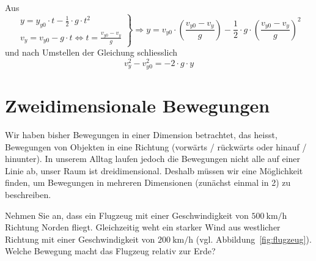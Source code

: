 \begin{solution}
Aus
\[ \left.\begin{array}{r}y=y_{y0} \cdot t - \frac{1}{2} \cdot g \cdot t^{2} \\ v_{y} = v_{y0} - g\cdot t \Leftrightarrow t = \frac{v_{y0} - v_{y}}{g} \end{array}  \right\} \Rightarrow y = v_{y0} \cdot \left( \frac{v_{y0} - v_{y}}{g} \right) - \frac{1}{2} \cdot g \cdot \left( \frac{v_{y0} - v_{y}}{g} \right)^{2} \]
und nach Umstellen der Gleichung schliesslich
\[ v_{y}^{2} - v_{y0}^{2} = -2 \cdot g \cdot y \]

\end{solution}


\newpage


\section{Zweidimensionale Bewegungen}
\begin{marginfigure} \center
    \caption{Ein Flugzeug fliegt mit einer Geschwindigkeit von \SI{500}{\kilo \metre \per \hour} nach Norden und wird gleichzeitig durch einen Wind mit einer Geschwindigkeit von \SI{200}{\kilo \metre \per \hour} in Richtung Osten bewegt.}
    \label{fig:flugzeug}
\end{marginfigure}
Wir haben bisher Bewegungen in einer Dimension betrachtet, das heisst, Bewegungen von Objekten in eine Richtung (vorwärts / rückwärts oder hinauf / hinunter). In unserem Alltag laufen jedoch die Bewegungen nicht alle auf einer Linie ab, unser Raum ist dreidimensional. Deshalb müssen wir eine Möglichkeit finden, um Bewegungen in mehreren Dimensionen (zunächst einmal in 2) zu beschreiben.
\begin{example}
Nehmen Sie an, dass ein Flugzeug mit einer Geschwindigkeit von $\SI{500}{\kilo \metre \per \hour}$ Richtung Norden fliegt. Gleichzeitig weht ein starker Wind aus westlicher Richtung mit einer Geschwindigkeit von $\SI{200}{\kilo \metre \per \hour}$ (vgl. Abbildung~\ref{fig:flugzeug}). Welche Bewegung macht das Flugzeug relativ zur Erde?

\end{example}

